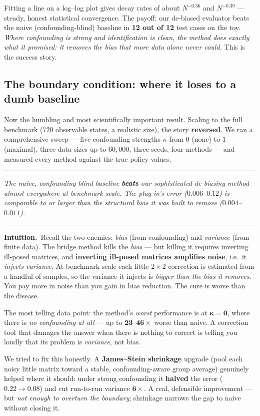 \documentclass[11pt]{article}
\newenvironment{takeaway}
  {\par\vspace{4pt}\noindent\begin{center}\begin{minipage}{0.94\linewidth}%
   \color{black!88}\rule{\linewidth}{0.7pt}\par\vspace{3pt}\small\itshape}
  {\par\vspace{3pt}\rule{\linewidth}{0.7pt}\end{minipage}\end{center}\vspace{4pt}}
\newcommand{\intuition}[1]{\vspace{2pt}\noindent\textbf{Intuition.}\ #1\par\vspace{2pt}}
\begin{document}
Fitting a line on a log--log plot gives decay rates of about $N^{-0.36}$ and
$N^{-0.39}$ --- steady, honest statistical convergence. The payoff: our de-biased
evaluator beats the naive (confounding-blind) baseline in \textbf{12 out of 12} test
cases on the toy. \emph{Where confounding is strong and identification is clean, the
method does exactly what it promised: it removes the bias that more data alone never
could.} This is the success story.

\subsection{The boundary condition: where it loses to a dumb baseline}
Now the humbling and most scientifically important result. Scaling to the full
benchmark ($720$ observable states, a realistic size), the story \textbf{reversed}.
We ran a comprehensive sweep --- five confounding strengths $\kappa$ from $0$ (none)
to $1$ (maximal), three data sizes up to $60{,}000$, three seeds, four methods --- and
measured every method against the true policy values.

\begin{takeaway}
The naive, confounding-blind baseline \textbf{beats} our sophisticated de-biasing
method almost everywhere at benchmark scale. The plug-in's error ($0.006$--$0.12$) is
comparable to or \emph{larger} than the structural bias it was built to remove
($0.004$--$0.011$).
\end{takeaway}

\intuition{Recall the two enemies: \emph{bias} (from confounding) and \emph{variance}
(from finite data). The bridge method kills the \emph{bias} --- but killing it
requires inverting ill-posed matrices, and \textbf{inverting ill-posed matrices
amplifies noise}, i.e.\ it \emph{injects variance}. At benchmark scale each little
$2\times2$ correction is estimated from a handful of samples, so the variance it
injects is \emph{bigger than the bias it removes}. You pay more in noise than you gain
in bias reduction. The cure is worse than the disease.}

The most telling data point: the method's \emph{worst} performance is at
$\boldsymbol{\kappa=0}$, where there is \emph{no confounding at all} --- up to
$\mathbf{23}$--$\mathbf{46\times}$ worse than naive. A correction tool that damages
the answer when there is nothing to correct is telling you loudly that its problem is
\emph{variance}, not bias.

We tried to fix this honestly. A \textbf{James--Stein shrinkage} upgrade (pool each
noisy little matrix toward a stable, confounding-aware group average) genuinely helped
where it should: under strong confounding it \textbf{halved} the error
($0.22\rightarrow0.08$) and cut run-to-run variance $\mathbf{6\times}$. A real,
defensible improvement --- but \emph{not enough to overturn the boundary}; shrinkage
narrows the gap to naive without closing it.
\end{document}
